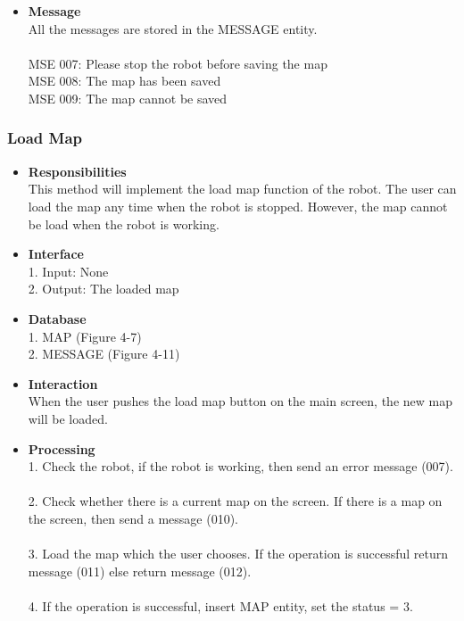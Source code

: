 \documentclass[11pt, a4paper]{article}
\begin{document}
\begin{itemize}
\item {\bfseries Message }\\
All the messages are stored in the MESSAGE entity.\\
\\
MSE 007: Please stop the robot before saving the map\\
MSE 008: The map has been saved\\
MSE 009: The map cannot be saved\\
\end{itemize}

\subsubsection{Load  Map }
\begin{itemize}
\item {\bfseries Responsibilities }\\
This method will implement the load map function of the robot. The user can load the map any time when the robot is stopped. However, the map cannot be load when the robot is working.

\item {\bfseries Interface }\\
1. Input: None\\
2. Output: The loaded map\\

\item {\bfseries Database }\\
1. MAP (Figure 4-7)\\
2. MESSAGE (Figure 4-11)\\

\item {\bfseries Interaction }\\
When the user pushes the load map button on the main screen, the new map will be loaded.\\

\item {\bfseries Processing }\\
1. Check the robot, if the robot is working, then send an error message (007).\\
\\
2. Check whether there is a current map on the screen. If there is a map on the screen, then send a message (010).\\
\\
3. Load the map which the user chooses. If the operation is successful return message (011) else return message (012).\\
\\
4. If the operation is successful, insert MAP entity, set the status = 3.\\


\end{itemize}
\end{document}
